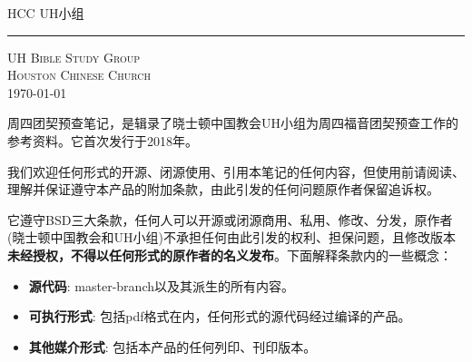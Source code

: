 \documentclass[Chinese,inNight]{CKBib}
\newcommand{\FormedWidth}{\paperwidth}
\newcommand{\FormedHeight}{\paperheight}
\newcommand{\Includepage}[2]{}
\begin{document}
\frontmatter
{}

\thispagestyle{empty}
\pagestyle{empty}
\Includepage{-}{cover.pdf}

\clearpage

\thispagestyle{empty}
\pagestyle{empty}

\begin{center}

\vspace*{0.2in}

\LARGE \SansF HCC UH小组

\vspace*{0.13in}

\HUGE {}

\vspace*{0.18in}

\hrule

\vspace*{0.18in}

\Large 
\begin{minipage}{\textwidth}
\end{minipage}

\normalsize

\vspace*{0.68in}

\scshape UH Bible Study Group\\
Houston Chinese Church\\
\upshape \today
\end{center}

\clearpage

\begin{footnotesize}

\noindent 周四团契预查笔记，是辑录了晓士顿中国教会UH小组为周四福音团契预查工作的参考资料。它首次发行于2018年。

\vspace{1em}

\noindent 我们欢迎任何形式的开源、闭源使用、引用本笔记的任何内容，但使用前请阅读、理解并保证遵守本产品的附加条款，由此引发的任何问题原作者保留追诉权。

\vspace{1em}

\noindent 它遵守BSD三大条款，任何人可以开源或闭源商用、私用、修改、分发，原作者(晓士顿中国教会和UH小组)不承担任何由此引发的权利、担保问题，且修改版本\textbf{未经授权，不得以任何形式的原作者的名义发布}。下面解释条款内的一些概念：

\begin{itemize}
  \item \textbf{源代码}: master-branch以及其派生的所有内容。
  \item \textbf{可执行形式}: 包括pdf格式在内，任何形式的源代码经过编译的产品。
  \item \textbf{其他媒介形式}: 包括本产品的任何列印、刊印版本。
\end{itemize}

\end{footnotesize}
\end{document}
